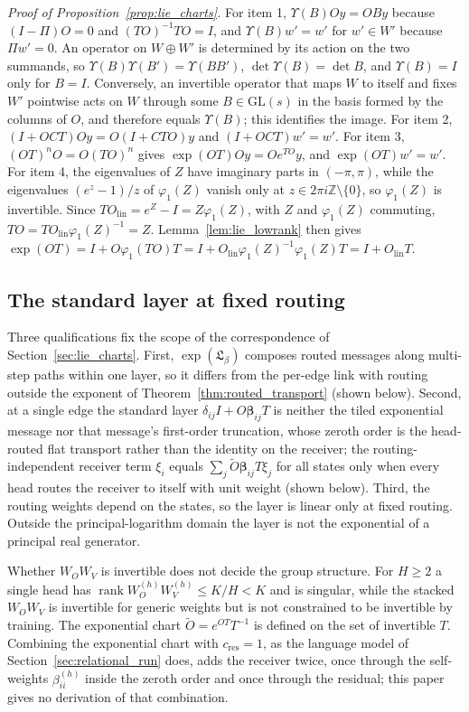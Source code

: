 \documentclass[twoside,11pt]{article}
\begin{document}
\emph{Proof of Proposition~\ref{prop:lie_charts}.} For item 1, $\Upsilon(B)Oy=OBy$ because $(I-\Pi)O=0$ and $(TO)^{-1}TO=I$, and $\Upsilon(B)w'=w'$ for $w'\in W'$ because $\Pi w'=0$. An operator on $W\oplus W'$ is determined by its action on the two summands, so $\Upsilon(B)\Upsilon(B')=\Upsilon(BB')$, $\det\Upsilon(B)=\det B$, and $\Upsilon(B)=I$ only for $B=I$. Conversely, an invertible operator that maps $W$ to itself and fixes $W'$ pointwise acts on $W$ through some $B\in\mathrm{GL}(s)$ in the basis formed by the columns of $O$, and therefore equals $\Upsilon(B)$; this identifies the image. For item 2, $(I+OCT)Oy=O(I+CTO)y$ and $(I+OCT)w'=w'$. For item 3, $(OT)^nO=O(TO)^n$ gives $\exp(OT)Oy=Oe^{TO}y$, and $\exp(OT)w'=w'$. For item 4, the eigenvalues of $Z$ have imaginary parts in $(-\pi,\pi)$, while the eigenvalues $(e^z-1)/z$ of $\varphi_1(Z)$ vanish only at $z\in2\pi i\mathbb Z\setminus\{0\}$, so $\varphi_1(Z)$ is invertible. Since $TO_{\mathrm{lin}}=e^Z-I=Z\varphi_1(Z)$, with $Z$ and $\varphi_1(Z)$ commuting, $TO=TO_{\mathrm{lin}}\varphi_1(Z)^{-1}=Z$. Lemma~\ref{lem:lie_lowrank} then gives $\exp(OT)=I+O\varphi_1(TO)T=I+O_{\mathrm{lin}}\varphi_1(Z)^{-1}\varphi_1(Z)T=I+O_{\mathrm{lin}}T$.

\subsection{The standard layer at fixed routing}
\label{app:proof_standard_layer}

Three qualifications fix the scope of the correspondence of Section~\ref{sec:lie_charts}. First, $\exp(\mathfrak L_\beta)$ composes routed messages along multi-step paths within one layer, so it differs from the per-edge link with routing outside the exponent of Theorem~\ref{thm:routed_transport} (shown below). Second, at a single edge the standard layer $\delta_{ij}I+O\boldsymbol\beta_{ij}T$ is neither the tiled exponential message nor that message's first-order truncation, whose zeroth order is the head-routed flat transport rather than the identity on the receiver; the routing-independent receiver term $\xi_i$ equals $\sum_j\widetilde O\boldsymbol\beta_{ij}T\xi_j$ for all states only when every head routes the receiver to itself with unit weight (shown below). Third, the routing weights depend on the states, so the layer is linear only at fixed routing. Outside the principal-logarithm domain the layer is not the exponential of a principal real generator.

Whether $W_OW_V$ is invertible does not decide the group structure. For $H\ge2$ a single head has $\operatorname{rank}W_O^{(h)}W_V^{(h)}\le K/H<K$ and is singular, while the stacked $W_OW_V$ is invertible for generic weights but is not constrained to be invertible by training. The exponential chart $\widetilde O=e^{OT}T^{-1}$ is defined on the set of invertible $T$. Combining the exponential chart with $c_{\mathrm{res}}=1$, as the language model of Section~\ref{sec:relational_run} does, adds the receiver twice, once through the self-weights $\beta_{ii}^{(h)}$ inside the zeroth order and once through the residual; this paper gives no derivation of that combination.
\end{document}
